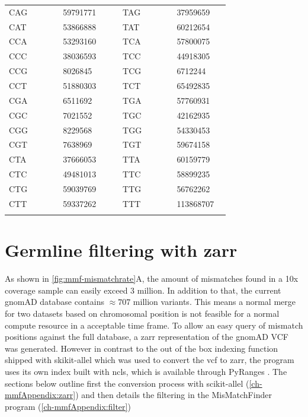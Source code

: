 \begin{table}[ht]
\begin{tabular}{|C{0.2\linewidth} | R{0.15\linewidth}| C{0.04\linewidth} |C{0.2\linewidth} | R{0.15\linewidth}|}
CAG & \num{ 59791771} &  &TAG & \num{ 37959659} \\
CAT & \num{ 53866888} &  &TAT & \num{ 60212654} \\
CCA & \num{ 53293160} &  &TCA & \num{ 57800075} \\
CCC & \num{ 38036593} &  &TCC & \num{ 44918305} \\
CCG & \num{ 8026845} &  &TCG & \num{ 6712244} \\
CCT & \num{ 51880303} &  &TCT & \num{ 65492835} \\
CGA & \num{ 6511692} &  &TGA & \num{ 57760931} \\
CGC & \num{ 7021552} &  &TGC & \num{ 42162935} \\
CGG & \num{ 8229568} &  &TGG & \num{ 54330453} \\
CGT & \num{ 7638969} &  &TGT & \num{ 59674158} \\
CTA & \num{ 37666053} &  &TTA & \num{ 60159779} \\
CTC & \num{ 49481013} &  &TTC & \num{ 58899235} \\
CTG & \num{ 59039769} &  &TTG & \num{ 56762262} \\
CTT & \num{ 59337262} &  &TTT & \num{ 113868707} \\
\hhline{|-|-|~|-|-|}
\bottomrule
\end{tabular}
\end{table}

\afterpage{\clearpage}


\section{Germline filtering with zarr}
\label{ch-mmfAppendix:germlineFilter}
As shown in \autoref{fig:mmf-mismatchrate}A, the amount of mismatches found in a 10x coverage sample can easily exceed $3$ million. In addition to that, the current gnomAD database contains $ \approx 707$ million variants. This means a normal merge for two datasets based on chromosomal position is not feasible for a normal compute resource in a acceptable time frame. To allow an easy query of mismatch positions against the full database, a zarr \cite{Miles2021}representation of the gnomAD VCF was generated. However in contrast to the out of the box indexing function shipped with skikit-allel \cite{Miles2021a} which was used to convert the vcf to zarr, the program uses its own index built with ncls, which is available through PyRanges \cite{Stovner2019}. The sections below outline first the conversion process with scikit-allel (\autoref{ch-mmfAppendix:zarr}) and then details the filtering in the MisMatchFinder program (\autoref{ch-mmfAppendix:filter})

